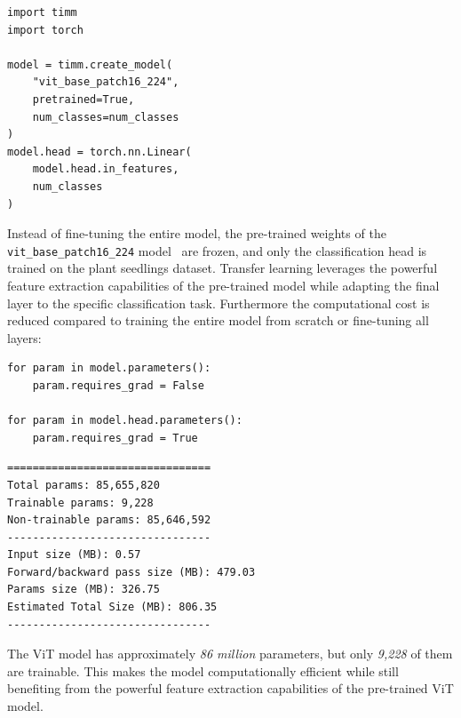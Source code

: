 \begin{minipage}{0.9\linewidth}\begin{lstlisting}[caption={Replacing the final classification layer of a pre-trained ViT model.},label={lst:pre-trained-vit}]
import timm
import torch

model = timm.create_model(
    "vit_base_patch16_224",
    pretrained=True,
    num_classes=num_classes
)
model.head = torch.nn.Linear(
    model.head.in_features,
    num_classes
)
\end{lstlisting}\end{minipage}

Instead of fine-tuning the entire model, the pre-trained weights of the \texttt{vit\_base\_patch16\_224} model~\cite{Wightman_PyTorch_Image_Models} are frozen, and only the classification head is trained on the plant seedlings dataset. Transfer learning leverages the powerful feature extraction capabilities of the pre-trained model while adapting the final layer to the specific classification task. Furthermore the computational cost is reduced compared to training the entire model from scratch or fine-tuning all layers:

\begin{minipage}{0.9\linewidth}\begin{lstlisting}[caption={Freezing the pre-trained ViT backbone and training only the classification head.},label={lst:freeze-vit-backbone}]
for param in model.parameters():
    param.requires_grad = False

for param in model.head.parameters():
    param.requires_grad = True
\end{lstlisting}\end{minipage}

\begin{minipage}{0.9\linewidth}\begin{lstlisting}[language={},caption={Pre-trained ViT model summary.},label={lst:pre-trained-vit-summary}]
================================
Total params: 85,655,820
Trainable params: 9,228
Non-trainable params: 85,646,592
--------------------------------
Input size (MB): 0.57
Forward/backward pass size (MB): 479.03
Params size (MB): 326.75
Estimated Total Size (MB): 806.35
--------------------------------
\end{lstlisting}\end{minipage}

The ViT model has approximately \textit{86 million} parameters, but only \textit{9,228} of them are trainable. This makes the model computationally efficient while still benefiting from the powerful feature extraction capabilities of the pre-trained ViT model.

